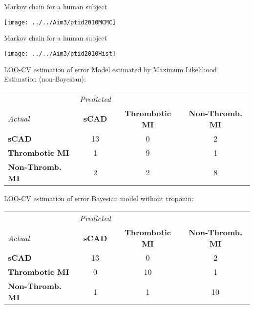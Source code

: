 \documentclass[xcolor=dvipsnames]{beamer}
\begin{document}
\begin{frame}{Markov chain for a human subject}
\vspace{-5pt}
\begin{center}
\texttt{[image: ../../Aim3/ptid2010MCMC]}
\end{center}
\end{frame}

\begin{frame}{Markov chain for a human subject}
\vspace{-7pt}
\begin{center}
\texttt{[image: ../../Aim3/ptid2010Hist]}
\end{center}
\end{frame}

\begin{frame}{LOO-CV estimation of error}
\vspace{-15pt}
Model estimated by Maximum Likelihood Estimation (non-Bayesian):
\vspace{4ex}

\begin{tabular}{l|ccc}
& \emph{Predicted} & & \\
\emph{Actual}  & \textbf{sCAD} & \textbf{Thrombotic MI} & \textbf{Non-Thromb. MI} \\
\hline
\textbf{sCAD} & 13 &  0 & 2\\
\textbf{Thrombotic MI} &   1 & 9 &  1\\
\textbf{Non-Thromb. MI}  & 2  & 2 & 8 
\end{tabular}
\end{frame}

\begin{frame}{LOO-CV estimation of error}
\vspace{-15pt}
Bayesian model without troponin:
\vspace{4ex}

\begin{tabular}{l|ccc}
& \emph{Predicted} & & \\
\emph{Actual} &  \textbf{sCAD} & \textbf{Thrombotic MI} & \textbf{Non-Thromb. MI} \\
\hline
\textbf{sCAD}   &     13    &     0    &     2\\
\textbf{Thrombotic MI}  &  0    &    10    &     1\\
\textbf{Non-Thromb. MI} &   1    &     1   &     10
\end{tabular}
\end{frame}
\end{document}
